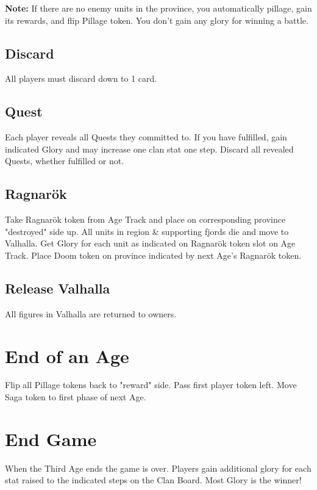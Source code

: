 \documentclass[12pt]{article}
\begin{document}
\begin{multicols*}{2}
    \textbf{Note:} If there are no enemy units in the province, you automatically pillage, gain its rewards, and flip Pillage token. You don't gain any glory for winning a battle.

\subsection*{Discard}
All players must discard down to 1 card.

\subsection*{Quest}
Each player reveals all Quests they committed to. If you have fulfilled, gain indicated Glory and may increase one clan stat one step. Discard all revealed Quests, whether fulfilled or not.

\subsection*{Ragnar\"ok}
Take Ragnar\"ok token from Age Track and place on corresponding province "destroyed" side up. All units in region \& supporting fjords die and move to Valhalla. Get Glory for each unit as indicated on Ragnar\"ok token slot on Age Track. Place Doom token on province indicated by next Age's Ragnar\"ok token.

\subsection*{Release Valhalla}
All figures in Valhalla are returned to owners.

\section*{End of an Age}
Flip all Pillage tokens back to "reward" side. Pass first player token left. Move Saga token to first phase of next Age.

\section*{End Game}
When the Third Age ends the game is over. Players gain additional glory for each stat raised to the indicated steps on the Clan Board. Most Glory is the winner!

\end{multicols*}
\end{document}
